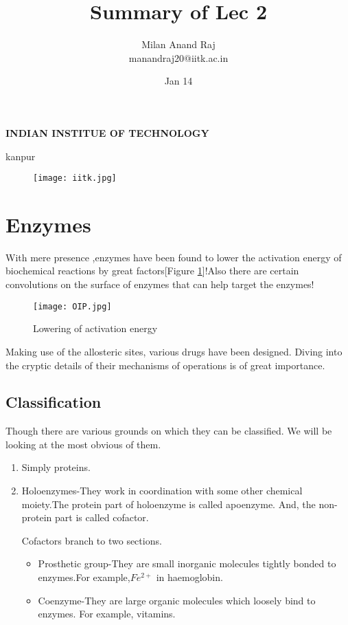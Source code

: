 \documentclass[12pt]{article}
\title{Summary of Lec 2}
\author{Milan Anand Raj\\manandraj20@iitk.ac.in}
\date{Jan 14}
\begin{document}
\NoBgThispage
\maketitle



\begin{center}
\textbf{INDIAN INSTITUE OF TECHNOLOGY}

kanpur
\end{center}


\vfill
\begin{figure}
\centering
\texttt{[image: iitk.jpg]}
\end{figure}
\clearpage
\tableofcontents
\clearpage
\NoBgThispage
\section{Enzymes}
With mere presence ,enzymes have been found to lower the activation energy of biochemical reactions by great factors[Figure \ref{fig oip}]!Also there are certain convolutions on the surface of enzymes that can help target the enzymes!
\begin{figure}[h]
\centering
\texttt{[image: OIP.jpg]}
\caption{Lowering of activation energy}
\label{fig oip}
\end{figure}
Making use of the allosteric sites, various drugs have been designed. Diving into the cryptic details of their mechanisms of operations is of great importance.
\subsection{Classification}
Though there are various grounds on which they can be classified. We will be looking at the most obvious of them.
\begin{enumerate}
\item Simply proteins.
\item Holoenzymes-They work in coordination with some other chemical moiety.The protein part of holoenzyme is called apoenzyme. And, the non-protein part is called cofactor.

Cofactors branch to two sections.
\begin{itemize}
\item Prosthetic group-They are small inorganic molecules tightly bonded to enzymes.For example,$Fe^{2+}$ in haemoglobin.
\item Coenzyme-They are large organic molecules which loosely bind to enzymes. For example, vitamins.
\end{itemize}
\end{enumerate}
\clearpage
\end{document}

